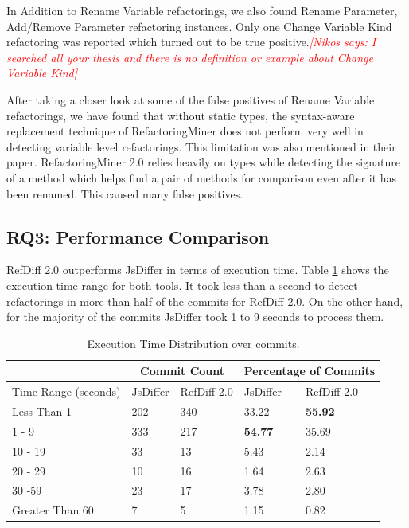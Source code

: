 \documentclass[letterpaper,12pt,onecolumn,final]{report}
\newcommand{\nikos}[1]{\textcolor{red}{{\it [Nikos says: #1]}}}
\begin{document}
In Addition to Rename Variable refactorings, we  also found Rename Parameter,  Add/Remove Parameter refactoring  instances. Only one Change Variable Kind refactoring was reported which turned out to be true positive.\nikos{I searched all your thesis and there is no definition or example about Change Variable Kind}

After taking a closer look at some of the false positives of Rename Variable refactorings, we have found that without static types, the syntax-aware replacement technique of RefactoringMiner does not perform very well in detecting variable level refactorings. This limitation was also mentioned in their paper. RefactoringMiner 2.0 relies heavily on types while detecting the signature of a method which helps find a pair of methods for comparison even after it has been renamed. This caused many false positives.


\subsection{RQ3: Performance Comparison}

RefDiff 2.0 outperforms JsDiffer in terms of execution time. Table \ref{table:performancecomparison} shows the execution time range for both tools. It took less than a second to detect refactorings in more than half of the commits for RefDiff 2.0. On the other hand, for the majority of the commits JsDiffer took 1 to 9 seconds to process them.

\begin{table}[!ht]
    \centering
    \caption{Execution Time Distribution over \evTotalCommits{} commits.}
    \begin{tabular}{|l|l|l|l|l|}
    \hline
        & \multicolumn{2}{|c|}{Commit Count} & \multicolumn{2}{|c|}{Percentage of Commits} \\ \hline
        Time Range (seconds) & JsDiffer & RefDiff 2.0 & JsDiffer & RefDiff 2.0 \\ \hline
        Less Than 1 & 202 & 340 & 33.22 & \bfseries 55.92 \\ \hline
        1 - 9 & 333 & 217 & \bfseries54.77 & 35.69 \\ \hline
        10 - 19 & 33 & 13 & 5.43 & 2.14 \\ \hline
        20 - 29 & 10 & 16 & 1.64 & 2.63 \\ \hline
        30 -59 & 23 & 17 & 3.78 & 2.80 \\ \hline
        Greater Than 60 & 7 & 5 & 1.15 & 0.82 \\ \hline
    \end{tabular}
    \label{table:performancecomparison}
\end{table}
\end{document}

